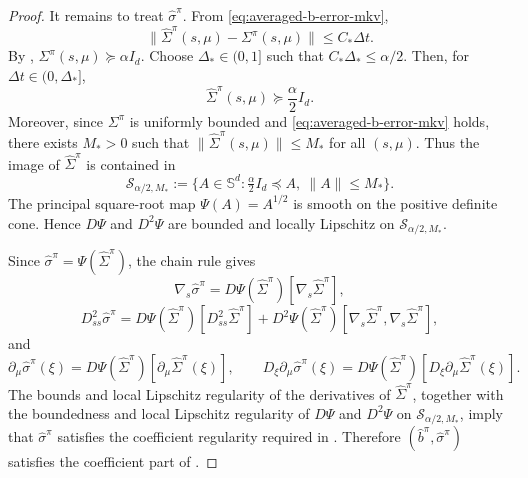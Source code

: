 \documentclass[a4paper, 10pt, english, reqno]{amsart}
\begin{document}
\begin{proof}
It remains to treat $\hat\sigma^\pi$. From
\eqref{eq:averaged-b-error-mkv},
\[
\|\hat\Sigma^\pi(s,\mu)-\Sigma^\pi(s,\mu)\|\le C_*\Delta t.
\]
By ,
$\Sigma^\pi(s,\mu)\succeq \alpha I_d$. Choose
$\Delta_*\in(0,1]$ such that $C_*\Delta_*\le\alpha/2$. Then, for
$\Delta t\in(0,\Delta_*]$,
\[
\hat\Sigma^\pi(s,\mu)\succeq \frac{\alpha}{2}I_d.
\]
Moreover, since $\Sigma^\pi$ is uniformly bounded and
\eqref{eq:averaged-b-error-mkv} holds, there exists $M_*>0$ such
that $\|\hat\Sigma^\pi(s,\mu)\|\le M_*$ for all $(s,\mu)$. Thus the
image of $\hat\Sigma^\pi$ is contained in
\[
\mathcal S_{\alpha/2,M_*}
:=
\{A\in\mathbb S^d:\tfrac{\alpha}{2}I_d\preceq A,\ \|A\|\le M_*\}.
\]
The principal square-root map $\Psi(A)=A^{1/2}$ is smooth on the positive
definite cone. Hence $D\Psi$ and $D^2\Psi$ are bounded and locally
Lipschitz on $\mathcal S_{\alpha/2,M_*}$.

Since $\hat\sigma^\pi=\Psi(\hat\Sigma^\pi)$, the chain rule gives
\[
\nabla_s\hat\sigma^\pi
=
D\Psi(\hat\Sigma^\pi)[\nabla_s\hat\Sigma^\pi],
\]
\[
D_{ss}^2\hat\sigma^\pi
=
D\Psi(\hat\Sigma^\pi)[D_{ss}^2\hat\Sigma^\pi]
+
D^2\Psi(\hat\Sigma^\pi)[\nabla_s\hat\Sigma^\pi,\nabla_s\hat\Sigma^\pi],
\]
and
\[
\partial_\mu\hat\sigma^\pi(\xi)
=
D\Psi(\hat\Sigma^\pi)[\partial_\mu\hat\Sigma^\pi(\xi)],
\qquad
D_\xi\partial_\mu\hat\sigma^\pi(\xi)
=
D\Psi(\hat\Sigma^\pi)[D_\xi\partial_\mu\hat\Sigma^\pi(\xi)].
\]
The bounds and local Lipschitz regularity of the derivatives of
$\hat\Sigma^\pi$, together with the boundedness and local Lipschitz
regularity of $D\Psi$ and $D^2\Psi$ on $\mathcal S_{\alpha/2,M_*}$,
imply that $\hat\sigma^\pi$ satisfies the coefficient regularity required
in . Therefore
$(\hat b^\pi,\hat\sigma^\pi)$ satisfies the coefficient part of
.
\end{proof}
\end{document}
